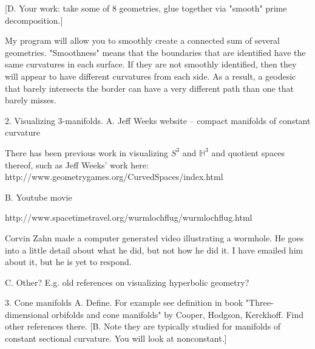 \documentclass[12pt]{amsart}
\begin{document}
  [D.  Your work:  take some of 8 geometries, glue together via "smooth" prime decomposition.]

My program will allow you to smoothly create a connected sum of several geometries. "Smoothness" means that the boundaries that are identified have the same curvatures in each surface. If they are not smoothly identified, then they will appear to have different curvatures from each side. As a result, a geodesic that barely intersects the border can have a very different path than one that barely misses.



2.  Visualizing 3-manifolds.
  A.  Jeff Weeks website -- compact manifolds of constant curvature

There has been previous work in visualizing $S^3$ and $\mathbb{H}^3$ and quotient spaces thereof, such as Jeff Weeks' work here: http://www.geometrygames.org/CurvedSpaces/index.html

  B.  Youtube movie

http://www.spacetimetravel.org/wurmlochflug/wurmlochflug.html

Corvin Zahn made a computer generated video illustrating a wormhole. He goes into a little detail about what he did, but not how he did it. I have emailed him about it, but he is yet to respond.

  C.  Other?  E.g. old references on visualizing hyperbolic geometry?

3.  Cone manifolds
  A.  Define.  For example see definition in book "Three-dimensional orbifolds and cone manifolds" by Cooper, Hodgson, Kerckhoff.  Find other references there.
  [B.  Note they are typically studied for manifolds of constant sectional curvature.  You will look at nonconstant.]
\end{document}
